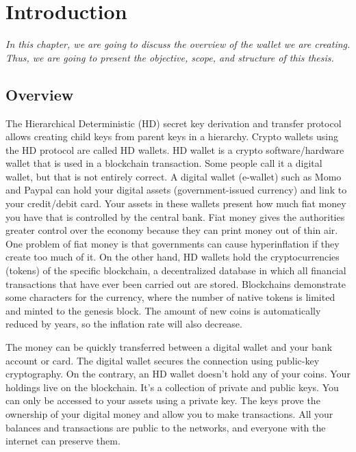 \chapter{Introduction} 
\label{Introduction}

\textit{In this chapter, we are going to discuss the overview of the wallet we are creating. Thus, we are going to present the objective, scope, and structure of this thesis.}
\adjustmtc
\minitoc
\section{Overview}
\label{overview}
\bigskip

The Hierarchical Deterministic (HD) secret key derivation and transfer protocol allows creating child keys from parent keys in a hierarchy. Crypto wallets using the HD protocol are called HD wallets. HD wallet is a crypto software/hardware wallet that is used in a blockchain transaction. Some people call it a digital wallet, but that is not entirely correct. A digital wallet (e-wallet) such as Momo and Paypal can hold your digital assets (government-issued currency) and link to your credit/debit card. Your assets in these wallets present how much fiat money you have that is controlled by the central bank. Fiat money gives the authorities greater control over the economy because they can print money out of thin air. One problem of fiat money is that governments can cause hyperinflation if they create too much of it. On the other hand, HD wallets hold the cryptocurrencies (tokens) of the specific blockchain, a decentralized database in which all financial transactions that have ever been carried out are stored. Blockchains demonstrate some characters for the currency, where the number of native tokens is limited and minted to the genesis block. The amount of new coins is automatically reduced by years, so the inflation rate will also decrease.

The money can be quickly transferred between a digital wallet and your bank account or card. The digital wallet secures the connection using public-key cryptography. On the contrary, an HD wallet doesn’t hold any of your coins. Your holdings live on the blockchain. It’s a collection of private and public keys. You can only be accessed to your assets using a private key. The keys prove the ownership of your digital money and allow you to make transactions. All your balances and transactions are public to the networks, and everyone with the internet can preserve them.

